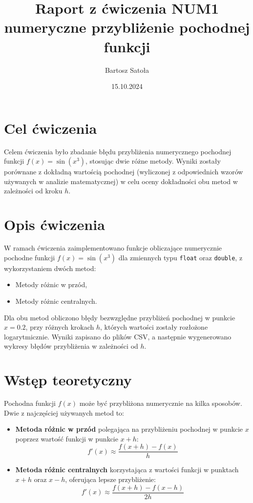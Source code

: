 \documentclass[a4paper, 12pt]{article}
\title{Raport z ćwiczenia NUM1\\numeryczne przybliżenie pochodnej funkcji}
\author{Bartosz Satoła}
\date{15.10.2024}
\begin{document}
\maketitle
\tableofcontents
\newpage

\section{Cel ćwiczenia}
Celem ćwiczenia było zbadanie błędu przybliżenia numerycznego pochodnej funkcji \( f(x) = \sin(x^3) \), stosując dwie różne metody.
Wyniki zostały porównane z dokładną wartością pochodnej (wyliczonej z odpowiednich wzorów używanych w analizie matematycznej) w celu oceny dokładności obu metod w zależności od kroku \( h \).

\section{Opis ćwiczenia}
W ramach ćwiczenia zaimplementowano funkcje obliczające numerycznie pochodne funkcji \( f(x) = \sin(x^3) \) dla zmiennych typu \texttt{float} oraz \texttt{double}, z wykorzystaniem dwóch metod:
\begin{itemize}
    \item Metody różnic w przód,
    \item Metody różnic centralnych.
\end{itemize}

Dla obu metod obliczono błędy bezwzględne przybliżeń pochodnej w punkcie \( x = 0.2 \), przy różnych krokach \( h \), których wartości zostały rozłożone logarytmicznie. Wyniki zapisano do plików CSV, a następnie wygenerowano wykresy błędów przybliżenia w zależności od \( h \).

\section{Wstęp teoretyczny}
Pochodna funkcji \( f(x) \) może być przybliżona numerycznie na kilka sposobów. Dwie z najczęściej używanych metod to:
\begin{itemize}
    \item \textbf{Metoda różnic w przód} polegająca na przybliżeniu pochodnej w punkcie \( x \) poprzez wartość funkcji w punkcie \( x + h \):
    \[
    f'(x) \approx \frac{f(x + h) - f(x)}{h}
    \]
    \item \textbf{Metoda różnic centralnych} korzystająca z wartości funkcji w punktach \( x + h \) oraz \( x - h \), oferująca lepsze przybliżenie:
    \[
    f'(x) \approx \frac{f(x + h) - f(x - h)}{2h}
    \]
\end{itemize}
\end{document}
